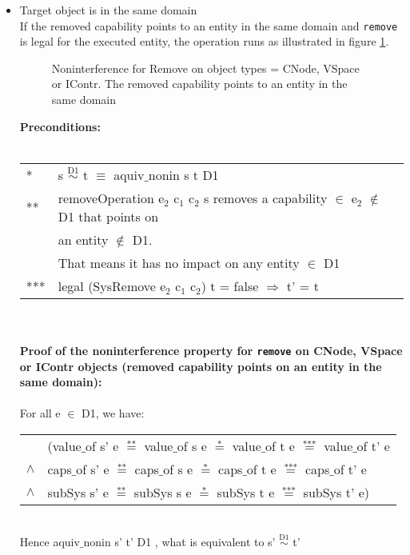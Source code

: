\begin{itemize}
\item Target object is in the same domain \\
If the removed capability points to an entity in the same domain and  \texttt{remove} is legal for the executed entity, the operation runs as illustrated in figure \ref{fig:RemoveCNode}.
\begin{figure}[H]
\caption{Noninterference for Remove on object types = CNode, VSpace or IContr. The removed capability points to an entity in the same domain}
\label{fig:RemoveCNode}
\end{figure}
\textbf{Preconditions:} \\ \\
\begin{tabular}{ll}
* & s $\overset{\text{D1}}{\sim}$ t $\equiv$ aquiv$\_$nonin s t D1	\\ 
** & removeOperation e$_2$ c$_1$ c$_2$ s removes a capability $\in$ e$_2$ $\notin$ D1 that points on \\
& an entity $\notin$ D1. \\
& That means it has no impact on any entity $\in$ D1 \\ 
*** & legal (SysRemove e$_2$ c$_1$ c$_2$) t = false $\Rightarrow$ t' = t
\end{tabular} \\ \\ 
\textbf{Proof of the noninterference property for \texttt{remove} on CNode, VSpace or IContr objects (removed capability points on an entity in the same domain):}\\ \\
For all e $\in$ D1, we have: \\ 
\begin{tabular}{ll}
& (value$\_$of s' e $\overset{\text{**}}{=}$ value$\_$of s e $\overset{\text{*}}{=}$ value$\_$of t e $\overset{\text{***}}{=}$ value$\_$of t' e \\
$\wedge$ & caps$\_$of s' e $\overset{\text{**}}{=}$ caps$\_$of s e $\overset{\text{*}}{=}$ caps$\_$of t e $\overset{\text{***}}{=}$ caps$\_$of t' e \\
$\wedge$ & subSys s' e $\overset{\text{**}}{=}$ subSys s e $\overset{\text{*}}{=}$ subSys t e $\overset{\text{***}}{=}$ subSys t' e)
\end{tabular} \\
Hence aquiv$\_$nonin s' t' D1 , what is equivalent to s' $\overset{\text{D1}}{\sim}$ t' \\ \\ 

\end{itemize}
